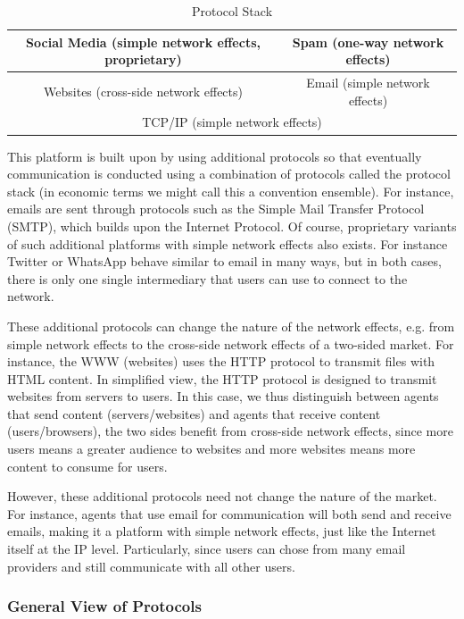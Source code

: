 \documentclass[a4paper,british]{article}\usepackage[]{graphicx}\usepackage[]{xcolor}
\providecommand{\tabularnewline}{\\}
\begin{document}
\begin{table}[H]
\caption{Protocol Stack}

\centering{}%
\begin{tabular}{|c|c|}
\hline 
Social Media (simple network effects, proprietary) &
Spam (one-way network effects)\tabularnewline
\hline 
Websites (cross-side network effects) &
Email (simple network effects)\tabularnewline
\hline 
\multicolumn{2}{|c|}{TCP/IP (simple network effects)}\tabularnewline
\hline 
\end{tabular}
\end{table}

This platform is built upon by using additional protocols so that
eventually communication is conducted using a combination of protocols
called the protocol stack (in economic terms we might call this a
\textquotedbl convention ensemble\textquotedbl ). For instance,
emails are sent through protocols such as the Simple Mail Transfer
Protocol (SMTP), which builds upon the Internet Protocol. Of course,
proprietary variants of such additional platforms with simple network
effects also exists. For instance Twitter or WhatsApp behave similar
to email in many ways, but in both cases, there is only one single
intermediary that users can use to connect to the network.

These additional protocols can change the nature of the network effects,
e.g. from simple network effects to the cross-side network effects
of a two-sided market. For instance, the WWW (websites) uses the HTTP
protocol to transmit files with HTML content. In simplified view,
the HTTP protocol is designed to transmit websites from servers to
users. In this case, we thus distinguish between agents that send
content (servers/websites) and agents that receive content (users/browsers),
the two sides benefit from cross-side network effects, since more
users means a greater audience to websites and more websites means
more content to consume for users.

However, these additional protocols need not change the nature of
the market. For instance, agents that use email for communication
will both send and receive emails, making it a platform with simple
network effects, just like the Internet itself at the IP level. Particularly,
since users can chose from many email providers and still communicate
with all other users. 

\subsubsection*{General View of Protocols}
\end{document}
